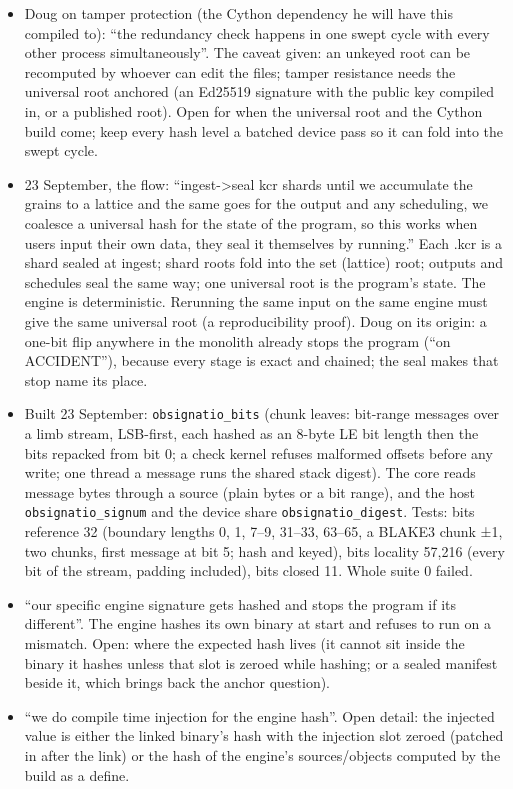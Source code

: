\begin{itemize}
\item Doug on tamper protection (the Cython dependency he will have this compiled to): “the redundancy check happens in one swept cycle with every other process simultaneously”. The caveat given: an unkeyed root can be recomputed by whoever can edit the files; tamper resistance needs the universal root anchored (an Ed25519 signature with the public key compiled in, or a published root). Open for when the universal root and the Cython build come; keep every hash level a batched device pass so it can fold into the swept cycle.
\item 23 September, the flow: “ingest->seal kcr shards until we accumulate the grains to a lattice and the same goes for the output and any scheduling, we coalesce a universal hash for the state of the program, so this works when users input their own data, they seal it themselves by running.” Each .kcr is a shard sealed at ingest; shard roots fold into the set (lattice) root; outputs and schedules seal the same way; one universal root is the program's state. The engine is deterministic. Rerunning the same input on the same engine must give the same universal root (a reproducibility proof). Doug on its origin: a one-bit flip anywhere in the monolith already stops the program (“on ACCIDENT”), because every stage is exact and chained; the seal makes that stop name its place.
\item Built 23 September: \texttt{obsignatio\_\allowbreak{}bits} (chunk leaves: bit-range messages over a limb stream, LSB-first, each hashed as an 8-byte LE bit length then the bits repacked from bit 0; a check kernel refuses malformed offsets before any write; one thread a message runs the shared stack digest). The core reads message bytes through a source (plain bytes or a bit range), and the host \texttt{obsignatio\_\allowbreak{}signum} and the device share \texttt{obsignatio\_\allowbreak{}digest}. Tests: bits reference 32 (boundary lengths 0, 1, 7–9, 31–33, 63–65, a BLAKE3 chunk ±1, two chunks, first message at bit 5; hash and keyed), bits locality 57,216 (every bit of the stream, padding included), bits closed 11. Whole suite 0 failed.
\item “our specific engine signature gets hashed and stops the program if its different”. The engine hashes its own binary at start and refuses to run on a mismatch. Open: where the expected hash lives (it cannot sit inside the binary it hashes unless that slot is zeroed while hashing; or a sealed manifest beside it, which brings back the anchor question).
\item “we do compile time injection for the engine hash”. Open detail: the injected value is either the linked binary's hash with the injection slot zeroed (patched in after the link) or the hash of the engine's sources/objects computed by the build as a define.

\end{itemize}
